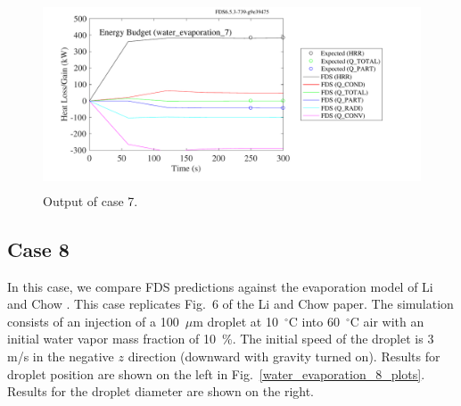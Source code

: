 \documentclass[11pt]{book}
\begin{document}
\begin{figure}[h!]
\centering
\includegraphics[height=2.2in]{SCRIPT_FIGURES/water_evaporation_7}
\caption[Sample case ]{Output of  case 7.}
\label{water_evaporation_7_plot}
\end{figure}

\clearpage

\subsection{Case 8}
\label{water_evaporation_8}

In this case, we compare FDS predictions against the evaporation model of Li and Chow \cite{LiChow:2008}. This case replicates Fig.~6 of the Li and Chow paper.  The simulation consists of an injection of a 100~$\mu$m droplet at 10~$^\circ$C into 60~$^\circ$C air with an initial water vapor mass fraction of 10~\%. The initial speed of the droplet is 3 m/s in the negative $z$ direction (downward with gravity turned on).  Results for droplet position are shown on the left in Fig.~\ref{water_evaporation_8_plots}.  Results for the droplet diameter are shown on the right.
\end{document}
